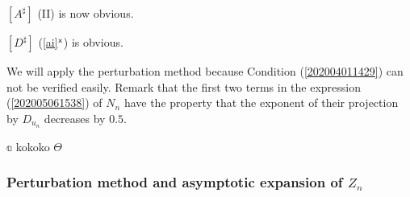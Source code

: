 \documentclass[a4paper,12pt]{article}
\numberwithin{equation}{section}
\numberwithin{equation}{section}
\begin{document}
\begin{en-text}
$[A^\sharp]$ (II) is now obvious. 

$[D^\sharp]$ (\ref{ai}$^{\sf x}$) is obvious. 


We will apply the perturbation method because Condition (\ref{202004011429}) can 
not be verified easily. 
Remark that the first two terms in the expression (\ref{202005061538}) of $N_n$ 
have the property that the exponent of 
their projection by $D_{u_n}$ decreases by $0.5$. 


${\mathbb a}$ kokoko
${\mathbb \Theta}$

\end{en-text}


\subsubsection{Perturbation method and asymptotic expansion of $Z_n$}\label{202005150029}
\end{document}
